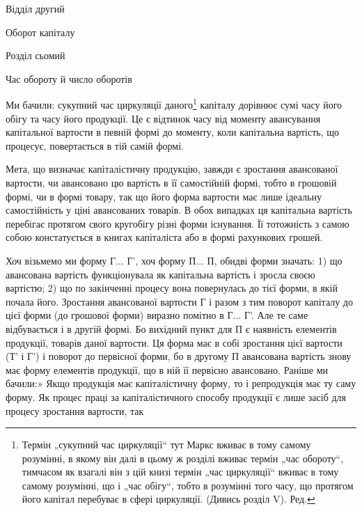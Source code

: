 Відділ другий

Оборот капіталу

Розділ сьомий

Час обороту й число оборотів

Ми бачили: сукупний час циркуляції даного\footnote*{
Термін „сукупний час циркуляції“ тут Маркс вживає в тому самому розумінні,
в якому він далі в цьому ж розділі вживає термін „час обороту“, тимчасом
як взагалі він з цій книзі термін „час циркуляції“ вживає в тому самому
розумінні, що і „час обігу“, тобто в розумінні того часу, що протягом його капітал
перебуває в сфері циркуляції. (Дивись розділ V). Ред.
} капіталу дорівнює сумі
часу його обігу та часу його продукції. Це є відтинок часу від моменту
авансування капітальної вартости в певній формі до моменту, коли капітальна
вартість, що процесує, повертається в тій самій формі.

Мета, що визначає капіталістичну продукцію, завжди є зростання
авансованої вартости, чи авансовано цю вартість в її самостійній формі,
тобто в грошовій формі, чи в формі товару, так що його форма вартости
має лише ідеальну самостійність у ціні авансованих товарів.
В обох випадках ця капітальна вартість перебігає протягом свого кругобігу
різні форми існування. Її тотожність з самою собою констатується
в книгах капіталіста або в формі рахункових грошей.

Хоч візьмемо ми форму Г... Г', хоч форму П... П, обидві форми
значать: 1) що авансована вартість функціонувала як капітальна вартість
і зросла своєю вартістю; 2) що по закінченні процесу вона повернулась
до тієї форми, в якій почала його. Зростання авансованої вартости Г і
разом з тим поворот капіталу до цієї форми (до грошової форми) виразно
помітно в Г... Г'. Але те саме відбувається і в другій формі. Бо
вихідний пункт для П є наявність елементів продукції, товарів даної
вартости. Ця форма має в собі зростання цієї вартости (Т' і Г') і поворот
до первісної форми, бо в другому П авансована вартість
знову має форму елементів продукції, що в ній її первісно авансовано.
Раніше ми бачили:» Якщо продукція має капіталістичну форму, то
і репродукція має ту саму форму. Як процес праці за капіталістичного
способу продукції є лише засіб для процесу зростання вартости, так
\parbreak{}  %
